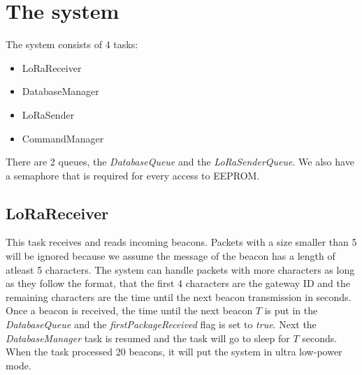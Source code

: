 \documentclass{scrartcl}
\begin{document}


\pagestyle{scrheadings}
\clearscrheadfoot

\cfoot{\pagemark}

\newpage

\section{The system}
The system consists of 4 tasks:
\begin{itemize}
    \item LoRaReceiver
    \item DatabaseManager
    \item LoRaSender
    \item CommandManager
\end{itemize}

There are 2 queues, the \textit{DatabaseQueue} and the \textit{LoRaSenderQueue}.
We also have a semaphore that is required for every access to EEPROM.

\subsection{LoRaReceiver}
This task receives and reads incoming beacons. Packets with a size smaller than 5 will be ignored because
we assume the message of the beacon has a length of atleast 5 characters. The system can handle packets with more characters
as long as they follow the format, that the first 4 characters are the gateway ID and the remaining characters are the time until the
next beacon transmission in seconds. Once a beacon is received, the time until the next beacon $T$ is put in the \textit{DatabaseQueue} and
the \textit{firstPackageReceived} flag is set to \textit{true}.
Next the \textit{DatabaseManager} task is resumed and the task will go to sleep for $T$ seconds.
When the task processed 20 beacons, it will put the system in ultra low-power mode.
\end{document}
